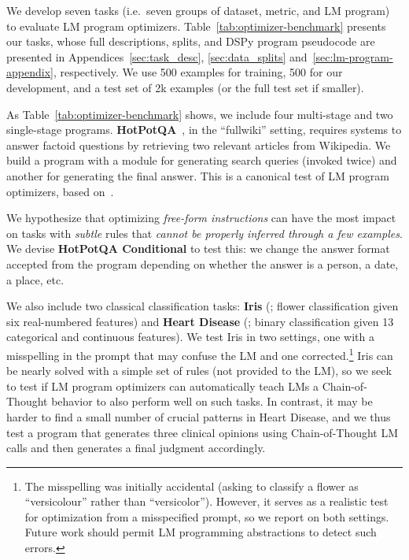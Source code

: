 We develop seven tasks (i.e.\ seven groups of dataset, metric, and LM program) to evaluate LM program optimizers. Table~\ref{tab:optimizer-benchmark} presents our tasks, whose full descriptions, splits, and DSPy program pseudocode are presented in Appendices~\ref{sec:task_desc}, \ref{sec:data_splits} and~\ref{sec:lm-program-appendix}, respectively. We use 500 examples for training, 500 for our development, and a test set of 2k examples (or the full test set if smaller).

As Table~\ref{tab:optimizer-benchmark} shows, we include four multi-stage and two single-stage programs. \textbf{HotPotQA}~\cite{yang-etal-2018-hotpotqa}, in the ``fullwiki'' setting, requires systems to answer factoid questions by retrieving two relevant articles from Wikipedia. We build a program with a module for generating search queries (invoked twice) and another for generating the final answer. This is a canonical test of LM program optimizers, based on~\citealt{khattab2024dspy}. 

We hypothesize that optimizing \textit{free-form instructions} can have the most impact on tasks with \textit{subtle} rules that \textit{cannot be properly inferred through a few examples}. We devise \textbf{HotPotQA Conditional} to test this: we change the answer format accepted from the program depending on whether the answer is a person, a date, a place, etc.

We also include two classical classification tasks: \textbf{Iris} (\citealt{Fisher1936THEUO}; flower classification given six real-numbered features) and \textbf{Heart Disease} (\citealt{Detrano1989InternationalAO}; binary classification given 13 categorical and continuous features). We test Iris in two settings, one with a misspelling in the prompt that may confuse the LM and one corrected.\footnote{The misspelling was initially accidental (asking to classify a flower as ``versicolour'' rather than ``versicolor''). However, it serves as a realistic test for optimization from a misspecified prompt, so we report on both settings. Future work should permit LM programming abstractions to detect such errors.} Iris can be nearly solved with a simple set of rules (not provided to the LM), so we seek to test if LM program optimizers can automatically teach LMs a Chain-of-Thought behavior to also perform well on such tasks. In contrast, it may be harder to find a small number of crucial patterns in Heart Disease, and we thus test a  program that generates three clinical opinions using Chain-of-Thought LM calls and then generates a final judgment accordingly.

